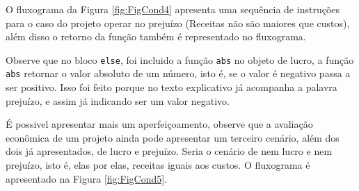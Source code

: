 \documentclass[
  11pt,
  a5paper,
  openany]{book}
\newenvironment{Shaded}{\begin{snugshade}}{\end{snugshade}}
\newcommand{\CharTok}[1]{\textcolor[rgb]{0.31,0.60,0.02}{#1}}
\newcommand{\CommentTok}[1]{\textcolor[rgb]{0.56,0.35,0.01}{\textit{#1}}}
\newcommand{\ControlFlowTok}[1]{\textcolor[rgb]{0.13,0.29,0.53}{\textbf{#1}}}
\newcommand{\DecValTok}[1]{\textcolor[rgb]{0.00,0.00,0.81}{#1}}
\newcommand{\KeywordTok}[1]{\textcolor[rgb]{0.13,0.29,0.53}{\textbf{#1}}}
\newcommand{\NormalTok}[1]{#1}
\newcommand{\OperatorTok}[1]{\textcolor[rgb]{0.81,0.36,0.00}{\textbf{#1}}}
\newcommand{\StringTok}[1]{\textcolor[rgb]{0.31,0.60,0.02}{#1}}
\begin{document}
O fluxograma da Figura \ref{fig:FigCond4} apresenta uma sequência de instruções para o caso do projeto operar no prejuízo (Receitas não são maiores que custos), além disso o retorno da função também é representado no fluxograma.

\begin{Shaded}
\end{Shaded}

Observe que no bloco \texttt{else}, foi incluido a função \texttt{abs} no objeto de lucro, a função \texttt{abs} retornar o valor absoluto de um número, isto é, se o valor é negativo passa a ser positivo. Isso foi feito porque no texto explicativo já acompanha a palavra prejuízo, e assim já indicando ser um valor negativo.

É possivel apresentar mais um aperfeiçoamento, observe que a avaliação econômica de um projeto ainda pode apresentar um terceiro cenário, além dos dois já apresentados, de lucro e prejuízo. Seria o cenário de nem lucro e nem prejuízo, isto é, elas por elas, receitas iguais aos custos. O fluxograma é apresentado na Figura \ref{fig:FigCond5}.
\end{document}
